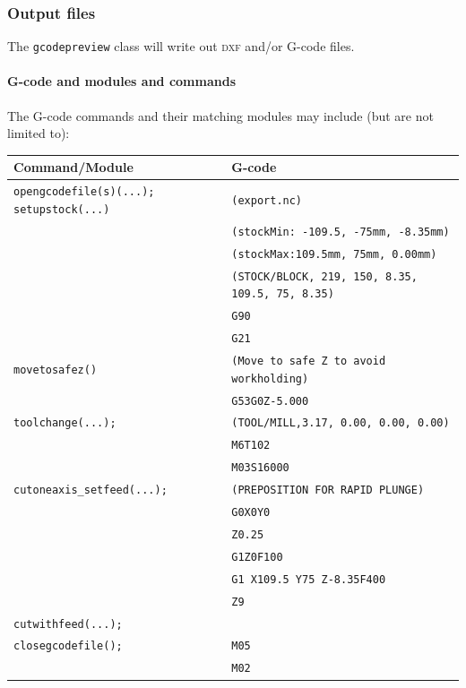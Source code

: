 \documentclass{ltxdoc}
\begin{document}
\subsubsection{Output files}

The \verb|gcodepreview| class will write out \textsc{dxf} and/or G-code files.

\paragraph{G-code and modules and commands}
 
The G-code commands and their matching modules may include (but are not limited to):

\bigskip

\noindent \begin{tabular}{@{}ll@{}} \toprule
 Command/Module                    & G-code                                        \\ \midrule
 \texttt{opengcodefile(s)(...);}
 \texttt{setupstock(...)}          & \texttt{(export.nc)}                          \\
                                   & \texttt{(stockMin: -109.5, -75mm, -8.35mm)}\\
                                   & \texttt{(stockMax:109.5mm, 75mm, 0.00mm)}\\
                                   & \texttt{(STOCK/BLOCK, 219, 150, 8.35, 109.5, 75, 8.35)}\\
                                   & \texttt{G90}\\
                                   & \texttt{G21} \\ \midrule
 \texttt{movetosafez()}            & \texttt{(Move to safe Z to avoid workholding)}\\
                                   & \texttt{G53G0Z-5.000}\\ \midrule
 \texttt{toolchange(...);}         & \texttt{(TOOL/MILL,3.17, 0.00, 0.00, 0.00)} \\
                                   & \texttt{M6T102} \\
                                   & \texttt{M03S16000} \\ \midrule
 \verb|cutoneaxis_setfeed(...);|   & \texttt{(PREPOSITION FOR RAPID PLUNGE)}\\
  & \texttt{G0X0Y0} \\
  & \texttt{Z0.25} \\
  & \texttt{G1Z0F100} \\
  & \texttt{G1 X109.5 Y75 Z-8.35F400} \\
  & \texttt{Z9}\\
 \texttt{cutwithfeed(...);}\\ \midrule

 \texttt{closegcodefile();}        & \texttt{M05}\\
                                   & \texttt{M02}\\ 
\bottomrule
\end{tabular}
\bigskip
\end{document}
